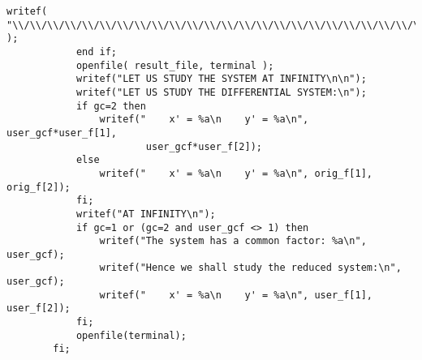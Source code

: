 \documentclass[a4paper,10pt]{article}
\begin{document}
\begin{lstlisting}[name=main]
                writef( "\\/\\/\\/\\/\\/\\/\\/\\/\\/\\/\\/\\/\\/\\/\\/\\/\\/\\/\\/\\/\\/\\/\\/\\/\\/\\/\\/\\/\\/\\/\\/\\/\\/\\/\\/\\/\\/\\/\\/\\/\n\n" );
            end if;
            openfile( result_file, terminal );
            writef("LET US STUDY THE SYSTEM AT INFINITY\n\n");
            writef("LET US STUDY THE DIFFERENTIAL SYSTEM:\n");
            if gc=2 then
                writef("    x' = %a\n    y' = %a\n", user_gcf*user_f[1],
                        user_gcf*user_f[2]);
            else
                writef("    x' = %a\n    y' = %a\n", orig_f[1], orig_f[2]);
            fi;
            writef("AT INFINITY\n");
            if gc=1 or (gc=2 and user_gcf <> 1) then
                writef("The system has a common factor: %a\n", user_gcf);
                writef("Hence we shall study the reduced system:\n", user_gcf);
                writef("    x' = %a\n    y' = %a\n", user_f[1], user_f[2]);
            fi;
            openfile(terminal);
        fi;


\end{lstlisting}
\end{document}
